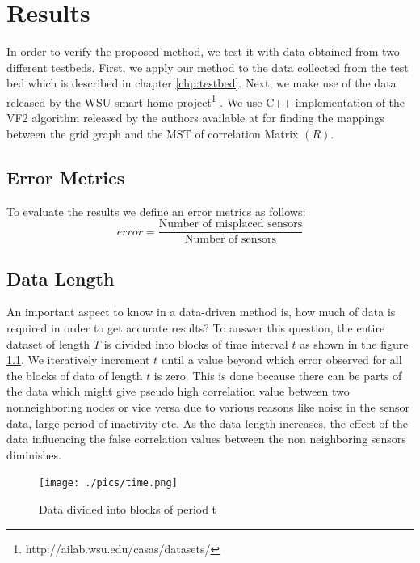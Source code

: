 \chapter{Results}
\label{chp:res}
In order to verify the proposed method, we test it with data obtained from two different testbeds. First, we apply our method to the data collected from the test bed which is described in chapter \ref{chp:testbed}. Next, we make use of the data released by the WSU smart home project\footnote{http://ailab.wsu.edu/casas/datasets/} \cite{cook2009assessing}. We use C++ implementation of the VF2 algorithm released by the authors available at \cite{vfLib} for finding the mappings between the grid graph and the MST of correlation Matrix $(R)$.
\section{Error Metrics }
To evaluate the results we define an error metrics as follows:\\
\begin{equation}
error=\frac{\text{Number of misplaced sensors}}{\text{Number of sensors}}
\end{equation}
\section{Data Length}
\label{sec:dataLength}
An important aspect to know in a data-driven method is, how much of data is required in order to get accurate results? To answer this question, the entire dataset of length $T$ is divided into blocks of time interval $t$ as shown in the figure \ref{fig:time}. We iteratively increment $t$ until a value beyond which error observed for all the blocks of data of length $t$ is zero. 
This is done because there can be parts of the data which might give pseudo high correlation value between two nonneighboring nodes or vice versa due to various reasons like noise in the sensor data, large period of inactivity etc. As the data length increases, the effect of the data influencing the false correlation values between the non neighboring sensors diminishes.

\begin{figure}[!ht]
\texttt{[image: ./pics/time.png]}
\caption{Data divided into blocks of period t}
\label{fig:time}
\end{figure}

